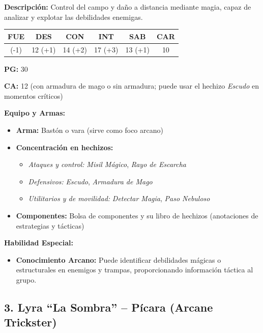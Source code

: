 \documentclass[
  twocolumn]{article}
\providecommand{\tightlist}{%
  \setlength{\itemsep}{0pt}\setlength{\parskip}{0pt}}
\begin{document}
\textbf{Descripción:} Control del campo y daño a distancia mediante
magia, capaz de analizar y explotar las debilidades enemigas.

\begin{longtable}[]{@{}cccccc@{}}
\toprule\noalign{}
FUE & DES & CON & INT & SAB & CAR \\
\midrule\noalign{}
\endhead
\bottomrule\noalign{}
\endlastfoot
8 (-1) & 12 (+1) & 14 (+2) & 17 (+3) & 13 (+1) & 10 \\
\end{longtable}

\textbf{PG:} 30

\textbf{CA:} 12 (con armadura de mago o sin armadura; puede usar el
hechizo \emph{Escudo} en momentos críticos)

\textbf{Equipo y Armas:}

\begin{itemize}
\tightlist
\item
  \textbf{Arma:} Bastón o vara (sirve como foco arcano)
\item
  \textbf{Concentración en hechizos:}

  \begin{itemize}
  \tightlist
  \item
    \emph{Ataques y control:} \emph{Misil Mágico}, \emph{Rayo de
    Escarcha}
  \item
    \emph{Defensivos:} \emph{Escudo}, \emph{Armadura de Mago}
  \item
    \emph{Utilitarios y de movilidad:} \emph{Detectar Magia}, \emph{Paso
    Nebuloso}
  \end{itemize}
\item
  \textbf{Componentes:} Bolsa de componentes y su libro de hechizos
  (anotaciones de estrategias y tácticas)
\end{itemize}

\textbf{Habilidad Especial:}

\begin{itemize}
\tightlist
\item
  \textbf{Conocimiento Arcano:} Puede identificar debilidades mágicas o
  estructurales en enemigos y trampas, proporcionando información
  táctica al grupo.
\end{itemize}

\subsection{3. Lyra ``La Sombra'' -- Pícara (Arcane
Trickster)}\label{lyra-la-sombra-puxedcara-arcane-trickster}
\end{document}
